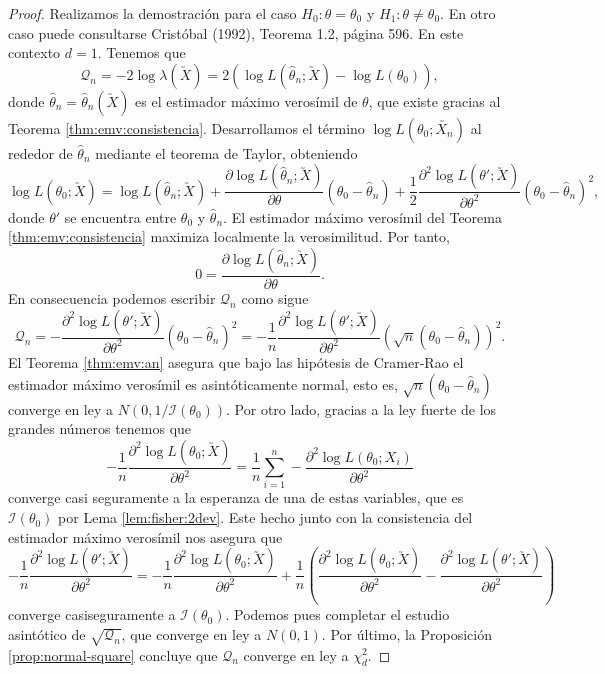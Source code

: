         \begin{proof}
            Realizamos la demostración para el caso $H_0: \theta = \theta_0$ y $H_1: \theta \ne \theta_0$. En otro caso puede consultarse Cristóbal (1992), Teorema 1.2, página 596. En este contexto $d = 1$. Tenemos que
            \[\mathcal{Q}_n = -2 \log \lambda(\utilde{X}) = 2 (\log L(\hat{\theta}_n; \utilde{X}) - \log L(\theta_0)),\]
            donde $\hat{\theta}_n = \hat{\theta}_n(\utilde{X})$ es el estimador máximo verosímil de $\theta$, que existe gracias al Teorema \ref{thm:emv:consistencia}. Desarrollamos el término $\log L(\theta_0; \utilde{X_n})$ al rededor de $\hat{\theta}_n$ mediante el teorema de Taylor, obteniendo
            \[\log L(\theta_0; \utilde{X}) = \log L(\hat{\theta}_n; \utilde{X}) + \frac{\partial \log L(\hat{\theta}_n; \utilde{X})}{\partial \theta}(\theta_0 -  \hat{\theta}_n) + \frac{1}{2} \frac{\partial^2 \log L(\theta'; \utilde{X})}{\partial \theta^2}(\theta_0 -  \hat{\theta}_n)^2,\]
            donde $\theta'$ se encuentra entre $\theta_0$ y $\hat{\theta}_n$. El estimador máximo verosímil del Teorema \ref{thm:emv:consistencia} maximiza localmente la verosimilitud. Por tanto,
            \[0 = \frac{\partial \log L(\hat{\theta}_n; \utilde{X})}{\partial \theta}.\]
            En consecuencia podemos escribir $\mathcal{Q}_n$ como sigue
            \[\mathcal{Q}_n = - \frac{\partial^2 \log L(\theta'; \utilde{X})}{\partial \theta^2}(\theta_0 -  \hat{\theta}_n)^2 = - \frac{1}{n} \frac{\partial^2 \log L(\theta'; \utilde{X})}{\partial \theta^2}(\sqrt{n}(\theta_0 -  \hat{\theta}_n))^2.\]
            El Teorema \ref{thm:emv:an} asegura que bajo las hipótesis de Cramer-Rao el estimador máximo verosímil es asintóticamente normal, esto es, $\sqrt{n}(\theta_0 -  \hat{\theta}_n)$ converge en ley a $N(0, 1/\mathcal{I}(\theta_0))$. Por otro lado, gracias a la ley fuerte de los grandes números tenemos que
            \[- \frac{1}{n} \frac{\partial^2 \log L(\theta_0; \utilde{X})}{\partial \theta^2} = \frac{1}{n} \sum_{i = 1}^n - \frac{\partial^2 \log L(\theta_0; X_i)}{\partial \theta^2}\]
            converge casi seguramente a la esperanza de una de estas variables, que es $\mathcal{I}(\theta_0)$ por Lema \ref{lem:fisher:2dev}. Este hecho junto con la consistencia del estimador máximo verosímil nos asegura que
            \[- \frac{1}{n} \frac{\partial^2 \log L(\theta'; \utilde{X})}{\partial \theta^2} = - \frac{1}{n} \frac{\partial^2 \log L(\theta_0; \utilde{X})}{\partial \theta^2} + \frac{1}{n}\left(\frac{\partial^2 \log L(\theta_0; \utilde{X})}{\partial \theta^2} -  \frac{\partial^2 \log L(\theta'; \utilde{X})}{\partial \theta^2}\right)\]
            converge casiseguramente a $\mathcal{I}(\theta_0)$. Podemos pues completar el estudio asintótico de $\sqrt{\mathcal{Q}_n}$, que converge en ley a $N(0, 1)$. Por último, la Proposición \ref{prop:normal-square} concluye que $\mathcal{Q}_n$ converge en ley a $\chi_d^2$.
        \end{proof}

